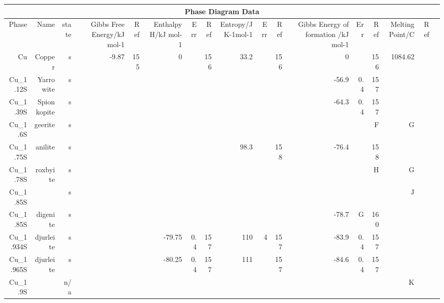 \begin{table}[htbp]
  \centering
  \begin{adjustbox}{width=1\textwidth}
    \begin{tabular}{rrrrrrrrrrrrrrrrr}
    \toprule
    \multicolumn{17}{c}{Phase Diagram Data} \\
    \midrule
    Phase & Name  & state & Gibbs Free Energy/kJ mol-1 & Ref   & Enthalpy H/kJ mol-1 & Err   & Ref   & Entropy/J K-1mol-1 & Err   & Ref   & Gibbs Energy of formation /kJ mol-1 & Err   & Ref   & Melting Point/C & Ref   &  \\
    Cu    & Copper & s     & -9.87 & 155   & 0     &       & 156   & 33.2  &       & 156   & 0     &       & 156   & 1084.62 &       &  \\
    Cu\_1.12S & Yarrowite & s     &       &       &       &       &       &       &       &       & -56.9 & 0.4   & 157   &       &       &  \\
    Cu\_1.39S & Spionkopite & s     &       &       &       &       &       &       &       &       & -64.3 & 0.4   & 157   &       &       &  \\
    Cu\_1.6S & geerite & s     &       &       &       &       &       &       &       &       &       &       & F     & G     &       &  \\
    Cu\_1.75S & anilite & s     &       &       &       &       &       & 98.3  &       & 158   & -76.4 &       & 158   &       &       &  \\
    Cu\_1.78S & roxbyite & s     &       &       &       &       &       &       &       &       &       &       & H     & G     &       &  \\
    Cu\_1.85S &       & s     &       &       &       &       &       &       &       &       &       &       &       & J     &       &  \\
    Cu\_1.85S & digenite & s     &       &       &       &       &       &       &       &       & -78.7 & G     & 160   &       &       &  \\
    Cu\_1.934S & djurleite & s     &       &       & -79.75 & 0.4   & 157   & 110   & 4     & 157   & -83.9 & 0.4   & 157   &       &       &  \\
    Cu\_1.965S & djurleite & s     &       &       & -80.25 & 0.4   & 157   & 111   &       & 157   & -84.6 & 0.4   & 157   &       &       &  \\
    Cu\_1.9S &       & n/a   &       &       &       &       &       &       &       &       &       &       &       & K     &       &  \\

\end{tabular}
\end{adjustbox}
\end{table}
